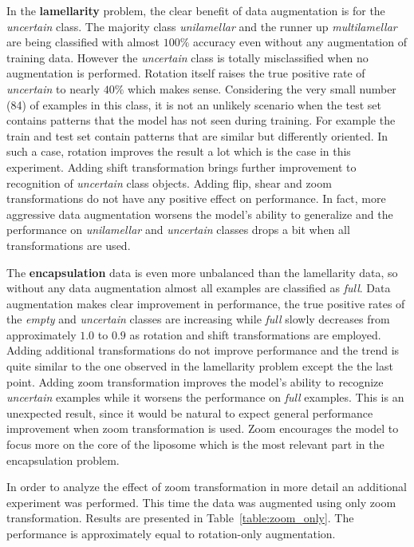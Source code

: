 \documentclass[a4paper, 11pt, table]{article}
\begin{document}
In the \textbf{lamellarity} problem, the clear benefit of data augmentation is for the \textit{uncertain} class. The majority  class \textit{unilamellar} and the runner up \textit{multilamellar} are being classified with almost $100\%$ accuracy even without any augmentation of training data. However the \textit{uncertain} class is totally misclassified when no augmentation is performed. Rotation itself raises the true positive rate of \textit{uncertain} to nearly $40\%$ which makes sense. Considering the very small number (84) of examples in this class, it is not an unlikely scenario when the test set contains patterns that the model has not seen during training. For example the train and test set contain patterns that are similar but differently oriented. In such a case, rotation improves the result a lot which is the case in this experiment. Adding shift transformation brings further improvement to recognition of \textit{uncertain} class objects. Adding flip, shear and zoom transformations do not have any positive effect on performance. In fact, more aggressive data augmentation worsens the model's ability to generalize and the performance on \textit{unilamellar} and \textit{uncertain} classes drops a bit when all transformations are used.

The \textbf{encapsulation} data is even more unbalanced than the lamellarity data, so without any data augmentation almost all examples are classified as \textit{full}. Data augmentation makes clear improvement in performance, the true positive rates of the \textit{empty} and \textit{uncertain} classes are increasing while \textit{full} slowly decreases from approximately $1.0$ to $0.9$ as rotation and shift transformations are employed. Adding additional transformations do not improve performance and the trend is quite similar to the one observed in the lamellarity problem except the the last point. Adding zoom transformation improves the model's ability to recognize \textit{uncertain} examples while it worsens the performance on \textit{full} examples. This is an unexpected result, since it would be natural to expect general performance improvement when zoom transformation is used. Zoom encourages the model to focus more on the core of the liposome which is the most relevant part in the encapsulation problem.

In order to analyze the effect of zoom transformation in more detail an additional experiment was performed. This time the data was augmented using only zoom transformation. Results are presented in Table~\ref{table:zoom_only}. The performance is approximately equal to rotation-only augmentation. 
\end{document}
